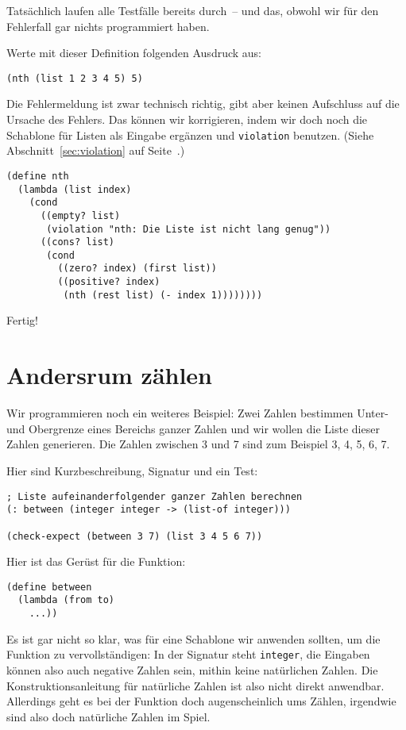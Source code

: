 %
Tatsächlich laufen alle Testfälle bereits durch~-- und das, obwohl wir
für den Fehlerfall gar nichts programmiert haben.
\begin{aufgabe}
  Werte mit dieser Definition folgenden Ausdruck aus:
\begin{lstlisting}
(nth (list 1 2 3 4 5) 5)
\end{lstlisting}
\end{aufgabe}
%
Die Fehlermeldung ist zwar technisch richtig, gibt aber keinen
Aufschluss auf die Ursache des Fehlers.  Das können wir korrigieren,
indem wir doch noch die Schablone für Listen als Eingabe ergänzen und
\lstinline{violation} benutzen.  (Siehe Abschnitt~\ref{sec:violation} auf
Seite~\pageref{sec:violation}.)
%
\begin{lstlisting}
(define nth
  (lambda (list index)
    (cond
      ((empty? list)
       (violation "nth: Die Liste ist nicht lang genug"))
      ((cons? list)
       (cond
         ((zero? index) (first list))
         ((positive? index)
          (nth (rest list) (- index 1))))))))
\end{lstlisting}
%
Fertig!

\section{Andersrum zählen}

Wir programmieren noch ein weiteres Beispiel: Zwei Zahlen bestimmen
Unter- und Obergrenze eines Bereichs ganzer Zahlen und wir wollen die
Liste dieser Zahlen generieren.  Die Zahlen zwischen 3 und 7 sind zum
Beispiel 3, 4, 5, 6, 7.

Hier sind Kurzbeschreibung, Signatur und ein Test:
%
\begin{lstlisting}
; Liste aufeinanderfolgender ganzer Zahlen berechnen
(: between (integer integer -> (list-of integer)))

(check-expect (between 3 7) (list 3 4 5 6 7))
\end{lstlisting}
%
Hier ist das Gerüst für die Funktion:
%
\begin{lstlisting}
(define between
  (lambda (from to)
    ...))
\end{lstlisting}
%
Es ist gar nicht so klar, was für eine Schablone wir anwenden sollten,
um die Funktion zu vervollständigen: In der Signatur steht
\lstinline{integer}, die Eingaben können also auch negative Zahlen sein,
mithin keine natürlichen Zahlen.  Die Konstruktionsanleitung für
natürliche Zahlen ist also nicht direkt anwendbar.  Allerdings geht es
bei der Funktion doch augenscheinlich ums Zählen, irgendwie sind also
doch natürliche Zahlen im Spiel.

